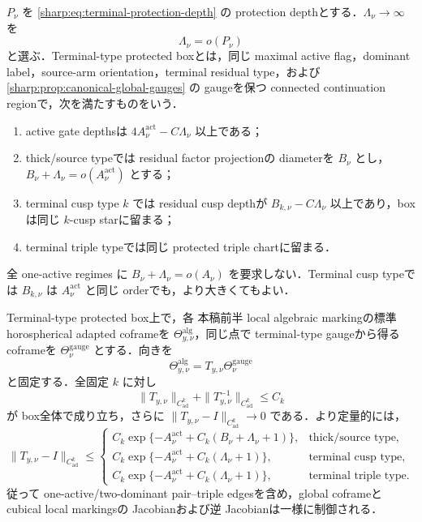 \documentclass[a4paper,11pt]{ltjsarticle}
\numberwithin{equation}{section}
\theoremstyle{plain}
\theoremstyle{definition}
\theoremstyle{remark}
\begin{document}
\begin{definition}\label{sharp:def:slow-protected-box}
$P_\nu$ を \eqref{sharp:eq:terminal-protection-depth} の protection depthとする．$\Lambda_\nu\to\infty$ を
\[
 \Lambda_\nu=o(P_\nu)
\]
と選ぶ．Terminal-type protected boxとは，同じ maximal active flag，dominant label，source-arm orientation，terminal residual type，および \cref{sharp:prop:canonical-global-gauges} の gaugeを保つ connected continuation regionで，次を満たすものをいう．
\begin{enumerate}[label=\textup{(P\arabic*)}]
\item active gate depthsは $4A_\nu^{\mathrm{act}}-C\Lambda_\nu$ 以上である；
\item thick/source typeでは residual factor projectionの diameterを $B_\nu$ とし，$B_\nu+\Lambda_\nu=o(A_\nu^{\mathrm{act}})$ とする；
\item terminal cusp type $k$ では residual cusp depthが $B_{k,\nu}-C\Lambda_\nu$ 以上であり，boxは同じ $k$-cusp starに留まる；
\item terminal triple typeでは同じ protected triple chartに留まる．
\end{enumerate}
全 one-active regimes に $B_\nu+\Lambda_\nu=o(A_\nu)$ を要求しない．Terminal cusp typeでは $B_{k,\nu}$ は $A_\nu^{\mathrm{act}}$ と同じ orderでも，より大きくてもよい．
\end{definition}

\begin{lemma}\label{sharp:lem:slow-box-frame-shear}
Terminal-type protected box上で，各 本稿前半 local algebraic markingの標準 horospherical adapted coframeを $\Theta^{\mathrm{alg}}_{y,\nu}$，同じ点で terminal-type gaugeから得る coframeを $\Theta^{\mathrm{gauge}}_\nu$ とする．向きを
\begin{equation}\label{sharp:eq:coframe-direction}
 \Theta^{\mathrm{alg}}_{y,\nu}=T_{y,\nu}\Theta^{\mathrm{gauge}}_\nu
\end{equation}
と固定する．全固定 $k$ に対し
\[
 \|T_{y,\nu}\|_{C^k_{\mathrm{ad}}}
 +\|T_{y,\nu}^{-1}\|_{C^k_{\mathrm{ad}}}\le C_k
\]
が box全体で成り立ち，さらに $\|T_{y,\nu}-I\|_{C^k_{\mathrm{ad}}}\to0$ である．より定量的には，
\begin{equation}\label{sharp:eq:gauge-adapted-shear-error}
 \|T_{y,\nu}-I\|_{C^k_{\mathrm{ad}}}
 \le
 \begin{cases}
 C_k\exp\{-A_\nu^{\mathrm{act}}+C_k(B_\nu+\Lambda_\nu+1)\},&\text{thick/source type},\\
 C_k\exp\{-A_\nu^{\mathrm{act}}+C_k(\Lambda_\nu+1)\},&\text{terminal cusp type},\\
 C_k\exp\{-A_\nu^{\mathrm{act}}+C_k(\Lambda_\nu+1)\},&\text{terminal triple type}.
 \end{cases}
\end{equation}
従って one-active/two-dominant pair--triple edgesを含め，global coframeと cubical local markingsの Jacobianおよび逆 Jacobianは一様に制御される．
\end{lemma}
\end{document}
